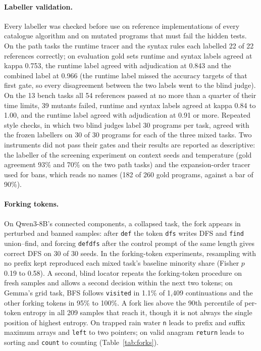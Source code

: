 \documentclass[11pt,letterpaper]{article}
\newcommand{\stok}[1]{\texttt{\textvisiblespace#1}}
\begin{document}
\paragraph{Labeller validation.} Every labeller was checked before use on reference implementations of every catalogue algorithm and on mutated programs that must fail the hidden tests. On the path tasks the runtime tracer and the syntax rules each labelled 22 of 22 references correctly; on evaluation gold sets runtime and syntax labels agreed at kappa 0.753, the runtime label agreed with adjudication at 0.843 and the combined label at 0.966 (the runtime label missed the accuracy targets of that first gate, so every disagreement between the two labels went to the blind judge). On the 13 bench tasks all 54 references passed at no more than a quarter of their time limits, 39 mutants failed, runtime and syntax labels agreed at kappa 0.84 to 1.00, and the runtime label agreed with adjudication at 0.91 or more. Repeated style checks, in which two blind judges label 30 programs per task, agreed with the frozen labellers on 30 of 30 programs for each of the three mixed tasks. Two instruments did not pass their gates and their results are reported as descriptive: the labeller of the screening experiment on context seeds and temperature (gold agreement 93\% and 70\% on the two path tasks) and the expansion-order tracer used for bans, which reads no names (182 of 260 gold programs, against a bar of 90\%).

\paragraph{Forking tokens.} On Qwen3-8B's connected components, a collapsed task, the fork appears in perturbed and banned samples: after \stok{def} the token \stok{dfs} writes DFS and \stok{find} union--find, and forcing \stok{def\textvisiblespace dfs} after the control prompt of the same length gives correct DFS on 30 of 30 seeds. In the forking-token experiments, resampling with no prefix kept reproduced each mixed task's baseline minority share (Fisher $p$ 0.19 to 0.58). A second, blind locator repeats the forking-token procedure on fresh samples and allows a second decision within the next two tokens; on Gemma's grid task, BFS follows \stok{visited} in 1.1\% of 1,409 continuations and the other forking tokens in 95\% to 100\%. A fork lies above the 90th percentile of per-token entropy in all 209 samples that reach it, though it is not always the single position of highest entropy. On trapped rain water \stok{n} leads to prefix and suffix maximum arrays and \stok{left} to two pointers; on valid anagram \stok{return} leads to sorting and \stok{count} to counting (Table~\ref{tab:forks}).
\end{document}
